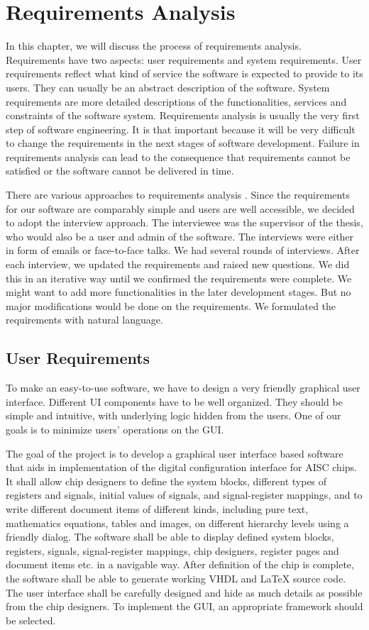\chapter{Requirements Analysis}
In this chapter, we will discuss the process of requirements analysis. Requirements have two aspects: user requirements and system requirements. User requirements reflect what kind of service the software is expected to provide to its users. They can usually be an abstract description of the software. System requirements are more detailed descriptions of the functionalities, services and constraints of the software system. Requirements analysis is usually the very first step of software engineering. It is that important because it will be very difficult to change the requirements in the next stages of software development. Failure in requirements analysis can lead to the consequence that requirements cannot be satisfied or the software cannot be delivered in time.

There are various approaches to requirements analysis \cite{kotonya1998requirements}. Since the requirements for our software are comparably simple and users are well accessible, we decided to adopt the interview approach. The interviewee was the supervisor of the thesis, who would also be a user and admin of the software. The interviews were either in form of emails or face-to-face talks. We had several rounds of interviews. After each interview, we updated the requirements and raised new questions. We did this in an iterative way until we confirmed the requirements were complete. We might want to add more functionalities in the later development stages. But no major modifications would be done on the requirements. We formulated the requirements with natural language.

\section{User Requirements}

To make an easy-to-use software, we have to design a very friendly graphical user interface. Different UI components have to be well organized. They should be simple and intuitive, with underlying logic hidden from the users. One of our goals is to minimize users' operations on the GUI.

The goal of the project is to develop a graphical user interface based software that aids in implementation of the digital configuration interface for AISC chips. It shall allow chip designers to define the system blocks, different types of registers and signals, initial values of signals, and signal-register mappings, and to write different document items of different kinds, including pure text, mathematics equations, tables and images, on different hierarchy levels using a friendly dialog. The software shall be able to display defined system blocks, registers, signals, signal-register mappings, chip designers, register pages and document items etc. in a navigable way. After definition of the chip is complete, the software shall be able to generate working VHDL and LaTeX source code. The user interface shall be carefully designed and hide as much details as possible from the chip designers. To implement the GUI, an appropriate framework should be selected.

